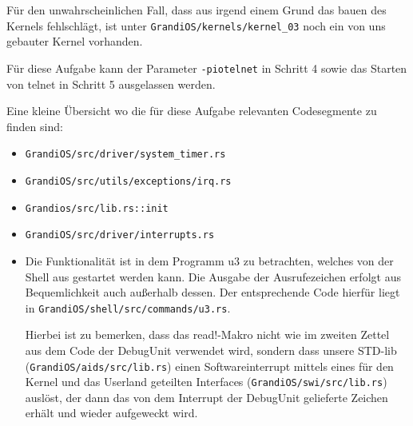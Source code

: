 \begin{description}
Für den unwahrscheinlichen Fall, dass aus irgend einem Grund das bauen des Kernels fehlschlägt, ist unter {\texttt{GrandiOS/kernels/kernel\_03}} noch ein von uns gebauter Kernel vorhanden.

Für diese Aufgabe kann der Parameter \texttt{-piotelnet} in Schritt 4 sowie das Starten von telnet in Schritt 5 ausgelassen werden.

Eine kleine Übersicht wo die für diese Aufgabe relevanten Codesegmente zu finden sind:
\begin{itemize}
	\item \texttt{GrandiOS/src/driver/system\_timer.rs}
	\item \texttt{GrandiOS/src/utils/exceptions/irq.rs}
	\item \texttt{Grandios/src/lib.rs::init}
	\item \texttt{GrandiOS/src/driver/interrupts.rs}
        \item Die Funktionalität ist in dem Programm u3 zu betrachten, welches von der Shell aus gestartet werden kann. Die Ausgabe der Ausrufezeichen erfolgt aus Bequemlichkeit auch außerhalb dessen. Der entsprechende Code hierfür liegt in \texttt{GrandiOS/shell/src/commands/u3.rs}.
          
          Hierbei ist zu bemerken, dass das read!-Makro nicht wie im zweiten Zettel aus dem Code der DebugUnit verwendet wird, sondern dass unsere STD-lib (\texttt{GrandiOS/aids/src/lib.rs}) einen Softwareinterrupt mittels eines für den Kernel und das Userland geteilten Interfaces (\texttt{GrandiOS/swi/src/lib.rs}) auslöst, der dann das von dem Interrupt der DebugUnit gelieferte Zeichen erhält und wieder aufgeweckt wird.
\end{itemize}

\end{description}

